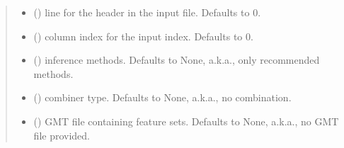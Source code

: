 \documentclass[letterpaper,10pt,english]{sphinxmanual}
\begin{document}
\begin{fulllineitems}
\begin{quote}
\begin{description}
\begin{itemize}
\item {} 
 (\sphinxstyleliteralemphasis{\sphinxupquote{, }}) \textendash{} line for the header in the input file.
Defaults to 0.

\item {} 
 (\sphinxstyleliteralemphasis{\sphinxupquote{, }}) \textendash{} column index for the input index.
Defaults to 0.

\item {} 
 (\sphinxstyleliteralemphasis{\sphinxupquote{, }}) \textendash{} inference methods. Defaults to None, a.k.a.,
only recommended methods.

\item {} 
 (\sphinxstyleliteralemphasis{\sphinxupquote{, }}) \textendash{} combiner type. Defaults to None, a.k.a.,
no combination.

\item {} 
 (\sphinxstyleliteralemphasis{\sphinxupquote{, }}) \textendash{} GMT file containing feature sets.
Defaults to None, a.k.a., no GMT file provided.

\end{itemize}

\end{description}\end{quote}

\end{fulllineitems}

\end{document}
